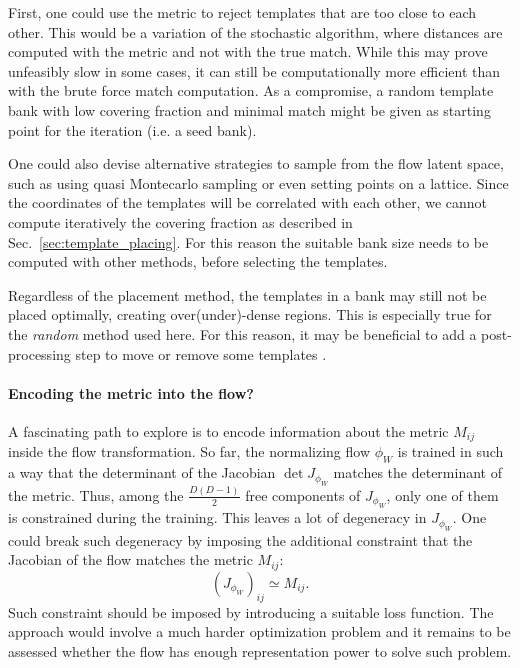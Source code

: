 \documentclass[twocolumn,showpacs,preprintnumbers,nofootinbib,prd,
superscriptaddress,10pt]{revtex4-2}
\begin{document}
First, one could use the metric to reject templates that are too close to each other. This would be a variation of the stochastic algorithm, where distances are computed with the metric and not with the true match. While this may prove unfeasibly slow in some cases, it can still be computationally more efficient than with the brute force match computation. As a compromise, a random template bank with low covering fraction and minimal match might be given as starting point for the iteration (i.e. a seed bank).

One could also devise alternative strategies to sample from the flow latent space, such as using quasi Montecarlo sampling or even setting points on a lattice.
Since the coordinates of the templates will be correlated with each other, we cannot compute iteratively the covering fraction as described in Sec.~\ref{sec:template_placing}. For this reason the suitable bank size needs to be computed with other methods, before selecting the templates.

Regardless of the placement method, the templates in a bank may still not be placed optimally, creating over(under)-dense regions. This is especially true for the {\it random} method used here. For this reason, it may be beneficial to add a post-processing step to move or remove some templates \cite{Indik:2017vqq}.

\paragraph{Encoding the metric into the flow?}

A fascinating path to explore is to encode information about the metric $M_{ij}$ inside the flow transformation.
So far, the normalizing flow $\phi_W$ is trained in such a way that the determinant of the Jacobian $\det J_{\phi_W}$ matches the determinant of the metric.
Thus, among the $\frac{D(D-1)}{2}$ free components of $J_{\phi_W}$, only one of them is constrained during the training. This leaves a lot of degeneracy in $J_{\phi_W}$.
One could break such degeneracy by imposing the additional constraint that the Jacobian of the flow matches the metric $M_{ij}$:
\begin{equation}
	(J_{\phi_W})_{ij} \simeq M_{ij}.
\end{equation}
Such constraint should be imposed by introducing a suitable loss function.
The approach would involve a much harder optimization problem and it remains to be assessed whether the flow has enough representation power to solve such problem.
\end{document}
